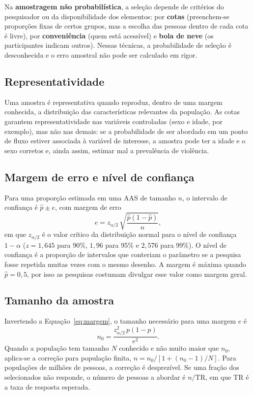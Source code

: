 \documentclass[12pt,a4paper]{article}
\begin{document}
Na \textbf{amostragem não probabilística}, a seleção depende de critérios do pesquisador ou da disponibilidade dos elementos: por \textbf{cotas} (preenchem-se proporções fixas de certos grupos, mas a escolha das pessoas dentro de cada cota é livre), por \textbf{conveniência} (quem está acessível) e \textbf{bola de neve} (os participantes indicam outros). Nessas técnicas, a probabilidade de seleção é desconhecida e o erro amostral não pode ser calculado em rigor.

\subsection{Representatividade}

Uma amostra é representativa quando reproduz, dentro de uma margem conhecida, a distribuição das características relevantes da população. As cotas garantem representatividade nas variáveis controladas (sexo e idade, por exemplo), mas não nas demais: se a probabilidade de ser abordado em um ponto de fluxo estiver associada à variável de interesse, a amostra pode ter a idade e o sexo corretos e, ainda assim, estimar mal a prevalência de violência.

\subsection{Margem de erro e nível de confiança}

Para uma proporção estimada em uma AAS de tamanho $n$, o intervalo de confiança é $\hat{p} \pm e$, com margem de erro
\begin{equation}
e = z_{\alpha/2}\,\sqrt{\frac{\hat{p}(1-\hat{p})}{n}},
\label{eq:margem}
\end{equation}
em que $z_{\alpha/2}$ é o valor crítico da distribuição normal para o nível de confiança $1-\alpha$ ($z = 1{,}645$ para 90\%, $1{,}96$ para 95\% e $2{,}576$ para 99\%). O nível de confiança é a proporção de intervalos que conteriam o parâmetro se a pesquisa fosse repetida muitas vezes com o mesmo desenho. A margem é máxima quando $\hat{p} = 0{,}5$, por isso as pesquisas costumam divulgar esse valor como margem geral.

\subsection{Tamanho da amostra}

Invertendo a Equação~\eqref{eq:margem}, o tamanho necessário para uma margem $e$ é
\begin{equation}
n_0 = \frac{z_{\alpha/2}^2\, p(1-p)}{e^2}.
\label{eq:tamanho}
\end{equation}
Quando a população tem tamanho $N$ conhecido e não muito maior que $n_0$, aplica-se a correção para população finita, $n = n_0 / \left[1 + (n_0 - 1)/N\right]$. Para populações de milhões de pessoas, a correção é desprezível. Se uma fração dos selecionados não responde, o número de pessoas a abordar é $n/\text{TR}$, em que TR é a taxa de resposta esperada.
\end{document}
